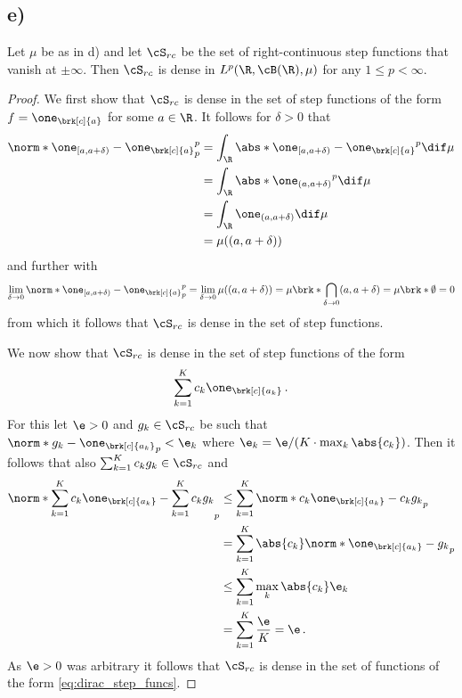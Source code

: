 \subsection{e)}
\begin{claim}
Let $\mu$ be as in d) and let $\cS_{rc}$ be the set of right-continuous step functions that vanish at $\pm\infty$. Then $\cS_{rc}$ is dense in $L^p(\R,\cB(\R),\mu)$ for any $1\leq p<\infty$.
\end{claim}
\begin{proof}
We first show that $\cS_{rc}$ is dense in the set of step functions of the form $f=\one_{\brk[c]{a}}$ for some $a\in\R$. It follows for $\delta>0$ that
\begin{align*}
	\norm*{\one_{[a,a+\delta)}-\one_{\brk[c]{a}}}^p_p
	&= \int_{\R} \abs*{\one_{[a,a+\delta)}-\one_{\brk[c]{a}}}^p\dif \mu \\
	&= \int_{\R} \abs*{\one_{(a,a+\delta)}}^p\dif \mu \\
	&= \int_{\R} \one_{(a,a+\delta)}\dif \mu \\
	&= \mu((a,a+\delta))
\end{align*}
and further with \cite[Proposition 1.2.5]{CohnMT}
\begin{align*}
	\lim_{\delta\to0}\norm*{\one_{[a,a+\delta)}-\one_{\brk[c]{a}}}^p_p
	= \lim_{\delta\to0}\mu((a,a+\delta))
	= \mu\brk*{\bigcap_{\delta\to0}(a,a+\delta)}
	= \mu\brk*{\emptyset} =0
\end{align*}
from which it follows that $\cS_{rc}$ is dense in the set of step functions.

We now show that $\cS_{rc}$ is dense in the set of step functions of the form
\begin{align}
	\sum_{k=1}^Kc_k\one_{\brk[c]{a_k}}\,.\label{eq:dirac_step_funcs}
\end{align}
For this let $\e>0$ and $g_k\in\cS_{rc}$ be such that $\norm*{g_k-\one_{\brk[c]{a_k}}}_p<\e_k$ where $\e_k=\e/(K\cdot \max_k\abs{c_k})$. Then it follows that also $\sum_{k=1}^Kc_kg_k\in\cS_{rc}$ and
\begin{align*}
	\norm*{\sum_{k=1}^Kc_k\one_{\brk[c]{a_k}}-\sum_{k=1}^Kc_kg_k}_p
	&\leq \sum_{k=1}^K\norm*{c_k\one_{\brk[c]{a_k}}-c_kg_k}_p \\
	&= \sum_{k=1}^K\abs{c_k}\norm*{\one_{\brk[c]{a_k}}-g_k}_p \\
	&\leq \sum_{k=1}^K\max_k\abs{c_k}\e_k \\
	&= \sum_{k=1}^K\frac{\e}{K}=\e\,.
\end{align*}
As $\e>0$ was arbitrary it follows that $\cS_{rc}$ is dense in the set of functions of the form \eqref{eq:dirac_step_funcs}.


\end{proof}
